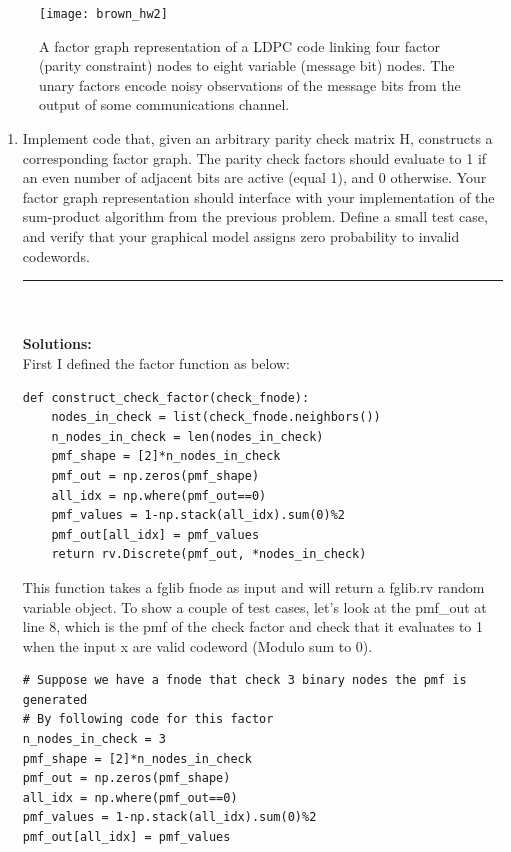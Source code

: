 \documentclass{article}
\begin{document}
\begin{enumerate}
\begin{figure}[t]
\centering
\texttt{[image: brown\_hw2]}
\caption{A factor graph representation of a LDPC code linking four factor (parity constraint)
nodes to eight variable (message bit) nodes. The unary factors encode noisy observations of the
message bits from the output of some communications channel. \cite{Brown}}
\label{fig:factor}
\end{figure}

\begin{enumerate}
\item Implement code that, given an arbitrary parity check matrix H, constructs a corresponding factor graph. The parity check factors should evaluate to 1 if an even number of adjacent bits are active (equal 1), and 0 otherwise. Your factor graph representation should interface with your implementation of the sum-product algorithm from the previous problem. Define a small test case, and verify that your graphical model assigns zero probability to invalid codewords.
\\
\noindent\rule{14cm}{2pt}
\\
\\
\textbf{Solutions:}
\\
First I defined the factor function as below:
\begin{verbatim}
def construct_check_factor(check_fnode):
    nodes_in_check = list(check_fnode.neighbors())
    n_nodes_in_check = len(nodes_in_check)
    pmf_shape = [2]*n_nodes_in_check
    pmf_out = np.zeros(pmf_shape)
    all_idx = np.where(pmf_out==0)
    pmf_values = 1-np.stack(all_idx).sum(0)%2
    pmf_out[all_idx] = pmf_values
    return rv.Discrete(pmf_out, *nodes_in_check)
\end{verbatim}
This function takes a fglib fnode as input and will return a fglib.rv random variable object. To show a couple of test cases, let's look at the pmf\_out at line 8, which is the pmf of the check factor and check that it evaluates to 1 when the input x are valid codeword (Modulo sum to 0). 

\begin{verbatim}
# Suppose we have a fnode that check 3 binary nodes the pmf is generated 
# By following code for this factor
n_nodes_in_check = 3
pmf_shape = [2]*n_nodes_in_check
pmf_out = np.zeros(pmf_shape)
all_idx = np.where(pmf_out==0)
pmf_values = 1-np.stack(all_idx).sum(0)%2
pmf_out[all_idx] = pmf_values


\end{verbatim}
\end{enumerate}
\end{enumerate}
\end{document}
